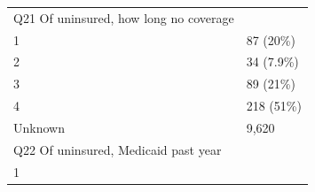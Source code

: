 \documentclass[]{article}
\begin{document}
\begin{longtable}[]{@{}ll@{}}
\begin{minipage}[t]{0.71\columnwidth}\raggedright
Q21 Of uninsured, how long no coverage\strut
\end{minipage} & \begin{minipage}[t]{0.23\columnwidth}\raggedright
\strut
\end{minipage}\tabularnewline
\begin{minipage}[t]{0.71\columnwidth}\raggedright
1\strut
\end{minipage} & \begin{minipage}[t]{0.23\columnwidth}\raggedright
87 (20\%)\strut
\end{minipage}\tabularnewline
\begin{minipage}[t]{0.71\columnwidth}\raggedright
2\strut
\end{minipage} & \begin{minipage}[t]{0.23\columnwidth}\raggedright
34 (7.9\%)\strut
\end{minipage}\tabularnewline
\begin{minipage}[t]{0.71\columnwidth}\raggedright
3\strut
\end{minipage} & \begin{minipage}[t]{0.23\columnwidth}\raggedright
89 (21\%)\strut
\end{minipage}\tabularnewline
\begin{minipage}[t]{0.71\columnwidth}\raggedright
4\strut
\end{minipage} & \begin{minipage}[t]{0.23\columnwidth}\raggedright
218 (51\%)\strut
\end{minipage}\tabularnewline
\begin{minipage}[t]{0.71\columnwidth}\raggedright
Unknown\strut
\end{minipage} & \begin{minipage}[t]{0.23\columnwidth}\raggedright
9,620\strut
\end{minipage}\tabularnewline
\begin{minipage}[t]{0.71\columnwidth}\raggedright
Q22 Of uninsured, Medicaid past year\strut
\end{minipage} & \begin{minipage}[t]{0.23\columnwidth}\raggedright
\strut
\end{minipage}\tabularnewline
\begin{minipage}[t]{0.71\columnwidth}\raggedright
1\strut
\end{minipage} & \begin{minipage}[t]{0.23\columnwidth}\raggedright

\end{minipage}
\end{longtable}
\end{document}
